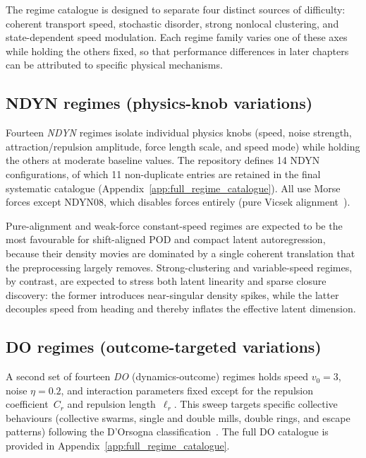 The regime catalogue is designed to separate four distinct sources of
difficulty: coherent transport speed, stochastic disorder, strong nonlocal
clustering, and state-dependent speed modulation.  Each regime family varies
one of these axes while holding the others fixed, so that performance
differences in later chapters can be attributed to specific physical
mechanisms.

\subsection{NDYN regimes (physics-knob variations)}
\label{subsec:ndyn_regimes}

Fourteen \emph{NDYN} regimes isolate individual physics knobs (speed, noise
strength, attraction/repulsion amplitude, force length scale, and speed
mode) while holding the others at moderate baseline values.
The repository defines 14 NDYN configurations, of which 11 non-duplicate
entries are retained in the final systematic catalogue
(Appendix~\ref{app:full_regime_catalogue}).
All use Morse
forces except NDYN08, which disables forces
entirely (pure Vicsek alignment~\cite{vicsek1995vicsek}).

Pure-alignment and weak-force constant-speed regimes are expected to be the
most favourable for shift-aligned POD and compact latent autoregression,
because their density movies are dominated by a single coherent translation
that the preprocessing largely removes.  Strong-clustering and
variable-speed regimes, by contrast, are expected to stress both latent
linearity and sparse closure discovery: the former introduces near-singular
density spikes, while the latter decouples speed from heading and thereby
inflates the effective latent dimension.

\subsection{DO regimes (outcome-targeted variations)}
\label{subsec:do_regimes}

A second set of fourteen \emph{DO} (dynamics-outcome) regimes holds speed
$v_0{=}3$, noise $\eta{=}0.2$, and interaction parameters fixed except for
the repulsion coefficient~$C_r$ and repulsion length~$\ell_r$.  This
sweep targets specific collective behaviours (collective swarms, single and
double mills, double rings, and escape patterns) following the D'Orsogna
classification~\cite{dorsogna2006morse}.  The full DO catalogue is provided
in Appendix~\ref{app:full_regime_catalogue}.

